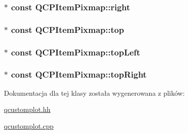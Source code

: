 \subsubsection[{\texorpdfstring{right}{right}}]{$\ast$ const Q\+C\+P\+Item\+Pixmap\+::right}\hypertarget{class_q_c_p_item_pixmap_ac9c0fd231f9e285765978a05d13f8280}{}\label{class_q_c_p_item_pixmap_ac9c0fd231f9e285765978a05d13f8280}
\subsubsection[{\texorpdfstring{top}{top}}]{$\ast$ const Q\+C\+P\+Item\+Pixmap\+::top}\hypertarget{class_q_c_p_item_pixmap_af7a156590b1d59ab21b453c430c56a7c}{}\label{class_q_c_p_item_pixmap_af7a156590b1d59ab21b453c430c56a7c}
\subsubsection[{\texorpdfstring{top\+Left}{topLeft}}]{$\ast$ const Q\+C\+P\+Item\+Pixmap\+::top\+Left}\hypertarget{class_q_c_p_item_pixmap_a43c281ef6ad46f3cf04f365289abe51a}{}\label{class_q_c_p_item_pixmap_a43c281ef6ad46f3cf04f365289abe51a}
\subsubsection[{\texorpdfstring{top\+Right}{topRight}}]{$\ast$ const Q\+C\+P\+Item\+Pixmap\+::top\+Right}\hypertarget{class_q_c_p_item_pixmap_a72eabd0010be41a4ec1b22aa983d2aa1}{}\label{class_q_c_p_item_pixmap_a72eabd0010be41a4ec1b22aa983d2aa1}


Dokumentacja dla tej klasy została wygenerowana z plików\+:\begin{DoxyCompactItemize}
\item 
\hyperlink{qcustomplot_8hh}{qcustomplot.\+hh}\item 
\hyperlink{qcustomplot_8cpp}{qcustomplot.\+cpp}\end{DoxyCompactItemize}
